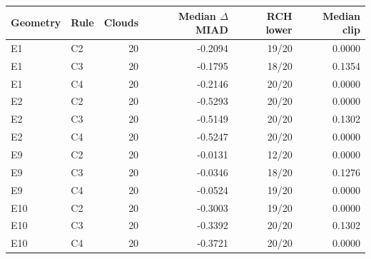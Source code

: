 \begin{tabular}{llrrrr}
\hline
Geometry & Rule & Clouds & Median $\Delta$MIAD & RCH lower & Median clip \\
\hline
E1 & C2 & 20 & -0.2094 & 19/20 & 0.0000 \\
E1 & C3 & 20 & -0.1795 & 18/20 & 0.1354 \\
E1 & C4 & 20 & -0.2146 & 20/20 & 0.0000 \\
E2 & C2 & 20 & -0.5293 & 20/20 & 0.0000 \\
E2 & C3 & 20 & -0.5149 & 20/20 & 0.1302 \\
E2 & C4 & 20 & -0.5247 & 20/20 & 0.0000 \\
E9 & C2 & 20 & -0.0131 & 12/20 & 0.0000 \\
E9 & C3 & 20 & -0.0346 & 18/20 & 0.1276 \\
E9 & C4 & 20 & -0.0524 & 19/20 & 0.0000 \\
E10 & C2 & 20 & -0.3003 & 19/20 & 0.0000 \\
E10 & C3 & 20 & -0.3392 & 20/20 & 0.1302 \\
E10 & C4 & 20 & -0.3721 & 20/20 & 0.0000 \\
\hline
\end{tabular}
